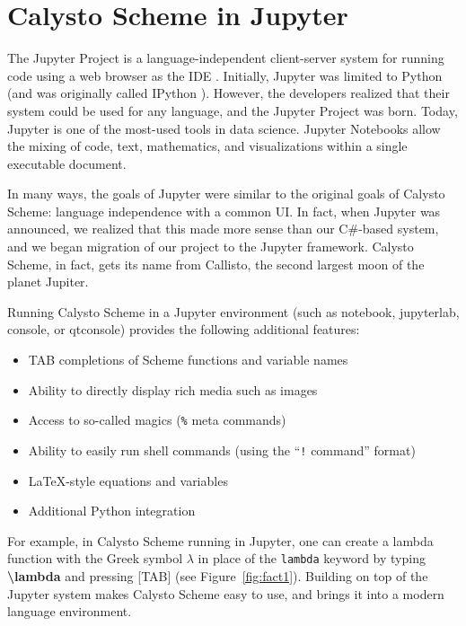\documentclass[acmsmall,screen,authorversion]{acmart}
\begin{document}

\section{Calysto Scheme in Jupyter}

The Jupyter Project is a language-independent client-server system for
running code using a web browser as the IDE
\cite{Kluyver2016jupyter}. Initially, Jupyter was limited to Python
(and was originally called IPython \cite{PER-GRA:2007}). However, the
developers realized that their system could be used for any language,
and the Jupyter Project was born. Today, Jupyter is one of the
most-used tools in data science. Jupyter Notebooks allow the mixing of
code, text, mathematics, and visualizations within a single executable
document.

In many ways, the goals of Jupyter were similar to the original goals of
Calysto Scheme: language independence with a common UI. In fact, when Jupyter
was announced, we realized that this made more sense than our C\#-based system,
and we began migration of our project to the Jupyter framework. Calysto Scheme,
in fact, gets its name from Callisto, the second largest moon of the planet
Jupiter.

Running Calysto Scheme in a Jupyter environment (such as notebook, jupyterlab,
console, or qtconsole) provides the following additional features:

\begin{itemize}
\item TAB completions of Scheme functions and variable names
\item Ability to directly display rich media such as images
\item Access to so-called magics (\texttt{\%} meta commands)
\item Ability to easily run shell commands (using the ``\texttt{!} command'' format)
\item \LaTeX-style equations and variables
\item Additional Python integration
\end{itemize}

For example, in Calysto Scheme running in Jupyter, one can create a lambda
function with the Greek symbol $\lambda$ in place of the \texttt{lambda}
keyword by typing \textbf{\textbackslash lambda} and pressing [TAB] (see
Figure~\ref{fig:fact1}). Building on top of the Jupyter system makes Calysto
Scheme easy to use, and brings it into a modern language environment.
\end{document}
